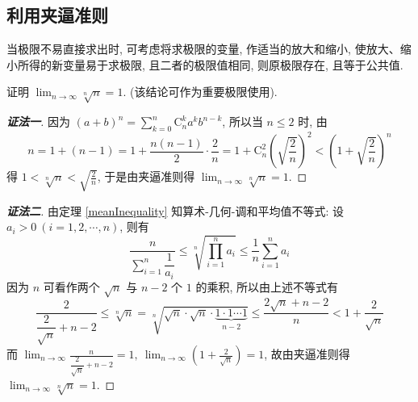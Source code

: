 \subsection{利用夹逼准则}

当极限不易直接求出时, 可考虑将求极限的变量, 作适当的放大和缩小, 使放大、缩小所得的新变量易于求极限,
且二者的极限值相同, 则原极限存在, 且等于公共值.


\begin{example}
    证明 $\displaystyle\lim_{n\to\infty}\sqrt[n]{n}=1.$ (该结论可作为重要极限使用).
    \label{sqrtnn1}
\end{example}
\begin{proof}[{\songti \textbf{证法一}}]
    因为 $\displaystyle(a+b)^n=\sum_{k=0}^{n}\mathrm{C}_n^ka^kb^{n-k}$, 所以当 $n\leqslant 2$ 时, 由
    $$n=1+(n-1)=1+\frac{n(n-1)}{2}\cdot\frac{2}{n}=1+\mathrm{C}_n^2\left(\sqrt{\frac{2}{n}}\right)^2<\left(1+\sqrt{\frac{2}{n}}\right)^n$$
    得 $\displaystyle 1<\sqrt[n]{n}<\sqrt{\frac{2}{n}}$, 于是由夹逼准则得 $\displaystyle\lim_{n\to\infty}\sqrt[n]{n}=1.$
\end{proof}
\begin{proof}[{\songti \textbf{证法二}}]
    由定理 \ref{meanInequality} 知算术-几何-调和平均值不等式: 设 $a_i>0~ (i=1,2,\cdots,n)$, 则有
    $$\frac{n}{\displaystyle\sum_{i=1}^{n}\dfrac{1}{a_i}}\leqslant\sqrt[n]{\prod_{i=1}^{n}a_i}\leqslant \frac{1}{n}\sum_{i=1}^{n}a_i$$
    因为 $n$ 可看作两个 $\sqrt{n}$ 与 $n-2$ 个 $1$ 的乘积, 所以由上述不等式有
    $$\frac{2}{\dfrac{2}{\sqrt{n}}+n-2}\leqslant\sqrt[n]{n}=\sqrt[n]{\sqrt{n}\cdot\sqrt{n}\cdot\underbrace{1\cdot1\cdots1}_{n-2}}\leqslant\frac{2\sqrt{n}+n-2}{n}<1+\frac{2}{\sqrt{n}}$$
    而 $\displaystyle\lim_{n\to\infty}\frac{n}{\dfrac{2}{\sqrt{n}}+n-2}=1,~\lim_{n\to\infty}\left(1+\frac{2}{\sqrt{n}}\right)=1$, 故由夹逼准则得 $\displaystyle\lim_{n\to\infty}\sqrt[n]{n}=1.$
\end{proof}

